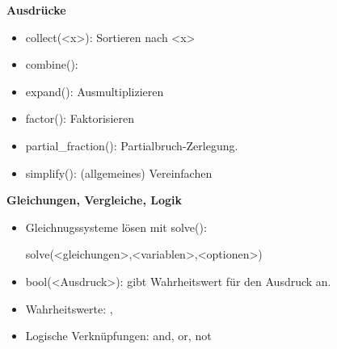 \documentclass[a4paper,9pt,DIV15,twocolumn]{scrartcl}
\begin{document}
\textbf{Ausdrücke}

  \begin{itemize}
   \item collect(<x>): Sortieren nach <x>
   \item combine(): 
   \item expand(): Ausmultiplizieren
   \item factor(): Faktorisieren
   \item partial\_fraction(): Partialbruch-Zerlegung.
   \item simplify(): (allgemeines) Vereinfachen
  \end{itemize}

\textbf{Gleichungen, Vergleiche, Logik}

\begin{itemize}
 \item Gleichnugssysteme lösen mit solve():
\begin{sagein}
 solve(<gleichungen>,<variablen>,<optionen>)
\end{sagein}
 \item bool(<Ausdruck>): gibt Wahrheitswert für den Ausdruck an.
 \item Wahrheitswerte: , 
 \item Logische Verknüpfungen: and, or, not
\end{itemize}
\end{document}
